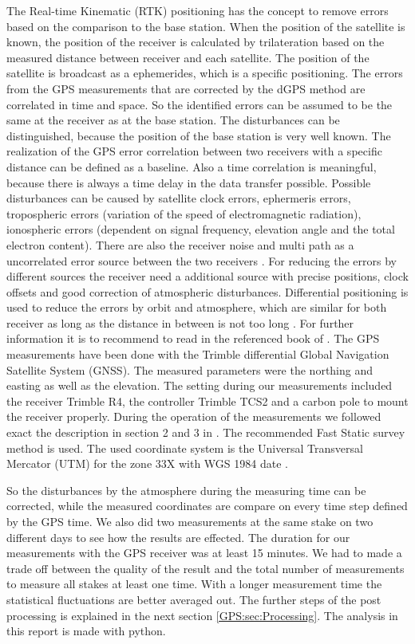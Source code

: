 The Real-time Kinematic (RTK) positioning has the concept to remove errors based on the comparison to the base station.
When the position of the satellite is known, the position of the receiver is calculated by trilateration based on the measured distance between receiver and each satellite.
The position of the satellite is broadcast as a ephemerides, which is a specific positioning.
The errors from the GPS measurements that are corrected by the dGPS method are correlated in time and space.
So the identified errors can be assumed to be the same at the receiver as at the base station.
The disturbances can be distinguished, because the position of the base station is very well known.
The realization of the GPS error correlation between two receivers with a specific distance can be defined as a baseline.
Also a time correlation is meaningful, because there is always a time delay in the data transfer possible.
Possible disturbances can be caused by satellite clock errors, ephermeris errors, tropospheric errors (variation of the speed of electromagnetic radiation), ionospheric errors (dependent on signal frequency, elevation angle and the total electron content). 
There are also the receiver noise and multi path as a uncorrelated error source between the two receivers \citep{UGPS}.
For reducing the errors by different sources the receiver need a additional source with precise positions, clock offsets and good correction of atmospheric disturbances. 
Differential positioning is used to reduce the errors by orbit and atmosphere, which are similar for both receiver as long as the distance in between is not too long \citep{Trprocess}.
For further information it is to recommend to read in the referenced book of \citep{UGPS}.
\medskip
The GPS measurements have been done with the Trimble differential Global Navigation Satellite System (GNSS). 
The measured parameters were the northing and easting as well as the elevation. 
The setting during our measurements included the receiver Trimble R4,
the controller Trimble TCS2 and a carbon pole to mount the receiver properly.
During the operation of the measurements we followed exact the description in section 2 and 3 in \cite{Trquickstart}. 
The recommended Fast Static survey method is used.
The used coordinate system is the Universal Transversal Mercator (UTM) for the zone 33X with WGS 1984 date \citep{Trquickstart}. 
\medskip

So the disturbances by the atmosphere during the measuring time can be corrected, while the measured coordinates are compare on every time step defined by the GPS time.
We also did two measurements at the same stake on two different days to see how the results are effected.
The duration for our measurements with the GPS receiver was at least 15 minutes. 
We had to made a trade off between the quality of the result and the total number of
measurements to measure all stakes at least one time. 
With a longer measurement time the statistical fluctuations are better averaged out.
The further steps of the post processing is explained in the next section \ref{GPS:sec:Processing}.\newline
The analysis in this report is made with python.


